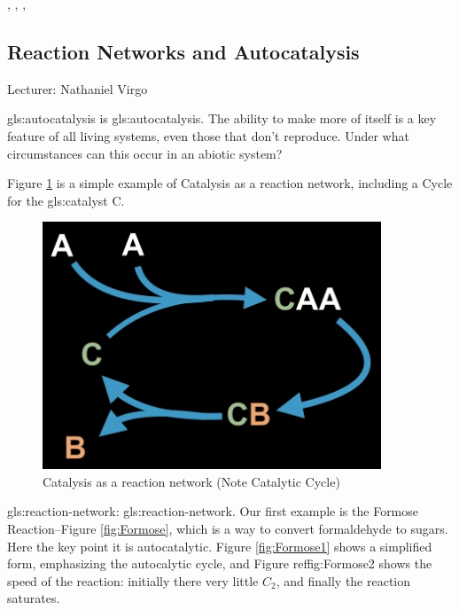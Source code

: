 \documentclass[]{article}
\begin{document}
\cite{wim2017origin},  \cite{wim2019wandering},    \cite{hordijk2012structure}, \cite{sousa2015autocatalytic}

\subsection{Reaction Networks and Autocatalysis}

Lecturer: Nathaniel Virgo

\Gls{gls:autocatalysis} is \glsdesc{gls:autocatalysis}. The ability to make more of itself is a key feature of all living systems, even those that don't reproduce. Under what circumstances can this occur in an abiotic system? 

Figure \ref{fig:CatalysisReactionNetwork} is a simple example of Catalysis as a reaction network, including a Cycle for the \gls{gls:catalyst} C.

\begin{figure}[H]
	\caption{Catalysis as a reaction network (Note Catalytic Cycle)}\label{fig:CatalysisReactionNetwork}
	\includegraphics[width=0.9\textwidth]{CatalysisReactionNetwork}
\end{figure}

\Gls{gls:reaction-network}: \glsdesc{gls:reaction-network}. Our first example is the Formose Reaction--Figure \ref{fig:Formose}\cite{andersen2013generic}, which is a way to convert formaldehyde to sugars. Here the key point it is autocatalytic. Figure \ref{fig:Formose1} shows a simplified form, emphasizing the autocalytic cycle, and Figure ref{fig:Formose2} shows the speed of the reaction: initially there very little $C_2$, and finally the reaction saturates.  
\end{document}
